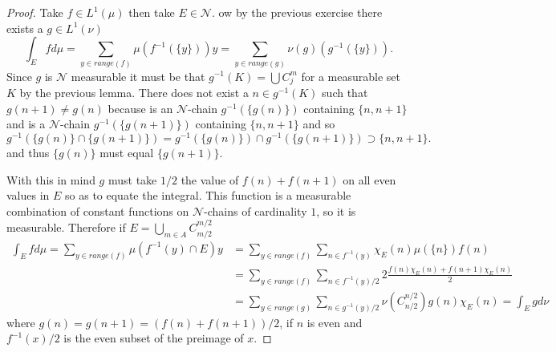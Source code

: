 \documentclass[11pt]{amsart}
\theoremstyle{definition}
\numberwithin{theorem}{section}
\numberwithin{definition}{section}
\numberwithin{equation}{section}
\def\scriptn{{\mathcal N}}
\begin{document}
\begin{proof}
	Take $f \in L^1(\mu)$ then take $E \in \scriptn$. ow by the previous exercise there exists a $g\in L^{1}(\nu)$
	\begin{equation*}
		\int_E f d \mu = \sum_{y \in range(f)} \mu(f^{-1}(\{y\}))y = \sum_{y\in range(g)} \nu(g) (g^{-1}(\{y\})).
	\end{equation*}
	Since $g$ is $\scriptn$ measurable it must be that $g^{-1}(K) = \bigcup C_j^m$ for a measurable set $K$ by the previous lemma. There does not exist a $n \in g^{-1}(K)$ such that $g(n+1)\neq g(n)$ because is an $\scriptn$-chain $g^{-1}(\{g(n)\})$ containing $\{n, n+1\}$ and is a $\scriptn$-chain $g^{-1}(\{g(n+1)\})$ containing $\{n, n+1\}$ and so 
	\begin{equation*}
		g^{-1}(\{g(n)\}\cap \{g(n+1)\}) = g^{-1}(\{g(n)\})\cap g^{-1}(\{g(n+1)\})  \supset \{n, n+1\}.
	\end{equation*}
	and thus $\{g(n)\}$ must equal $\{g(n+1)\}$.

	With this in mind $g$ must take $1/2$ the value of $f(n)+f(n+1)$ on all even values in $E$ so as to equate the integral. This function is a measurable combination of constant functions on $\scriptn$-chains of cardinality $1$, so it is measurable. 
	Therefore if $E = \bigcup_{m\in A} C_{m/2}^{m/2}$
	\begin{equation*}
	\begin{aligned}
		 \int_E f d\mu = \sum_{y \in range(f)} \mu{(f^{-1}(y) \cap E)} y &= \sum_{y \in range(f)} \sum_{n \in f^{-1}(y)} \chi_E(n) \mu(\{n\}) {f(n)} \\
		&= \sum_{y \in range(f)} \sum_{n \in f^{-1}(y)/2} 2\frac{f(n)\chi_E(n) + f(n+1)\chi_E(n)}{2} \\
		&= \sum_{y \in range(g)} \sum_{n \in g^{-1}(y)/2} \nu(C_{n/2}^{n/2}) g(n) \chi_E(n) = \int_E g d\nu
	\end{aligned}
	\end{equation*}
	where $g(n) = g(n+1) = (f(n) + f(n+1))/2$, if $n$ is even and $ f^{-1}(x)/2$ is the even subset of the preimage of $x$. 
\end{proof}
\end{document}
